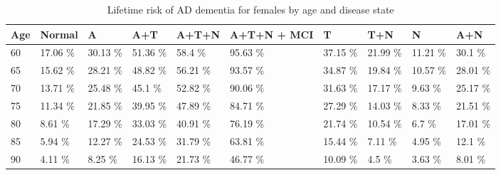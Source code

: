 \begin{table}[ht]
\centering
\begin{tabular}{llllllllll}
  \hline
Age & Normal & A & A+T & A+T+N & A+T+N + MCI & T & T+N & N & A+N \\ 
  \hline
60 & 17.06 \% & 30.13 \% & 51.36 \% & 58.4 \% & 95.63 \% & 37.15 \% & 21.99 \% & 11.21 \% & 30.1 \% \\ 
  65 & 15.62 \% & 28.21 \% & 48.82 \% & 56.21 \% & 93.57 \% & 34.87 \% & 19.84 \% & 10.57 \% & 28.01 \% \\ 
  70 & 13.71 \% & 25.48 \% & 45.1 \% & 52.82 \% & 90.06 \% & 31.63 \% & 17.17 \% & 9.63 \% & 25.17 \% \\ 
  75 & 11.34 \% & 21.85 \% & 39.95 \% & 47.89 \% & 84.71 \% & 27.29 \% & 14.03 \% & 8.33 \% & 21.51 \% \\ 
  80 & 8.61 \% & 17.29 \% & 33.03 \% & 40.91 \% & 76.19 \% & 21.74 \% & 10.54 \% & 6.7 \% & 17.01 \% \\ 
  85 & 5.94 \% & 12.27 \% & 24.53 \% & 31.79 \% & 63.81 \% & 15.44 \% & 7.11 \% & 4.95 \% & 12.1 \% \\ 
  90 & 4.11 \% & 8.25 \% & 16.13 \% & 21.73 \% & 46.77 \% & 10.09 \% & 4.5 \% & 3.63 \% & 8.01 \% \\ 
   \hline
\end{tabular}
\caption{Lifetime risk of AD dementia for females by age and disease state} 
\end{table}
